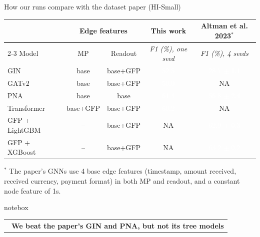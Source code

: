 \documentclass[aspectratio=169,10pt,t]{beamer}
\makeatletter
\newif\ifkeyboxfirst
\newcommand{\keyboxrow}{\ifkeyboxfirst\global\keyboxfirstfalse\else\\[2pt]\fi\usebeamertemplate{itemize item}~}
\newenvironment{keybox}[1][\bfseries]{\par\smallskip\noindent\global\keyboxfirsttrue
  \let\item\keyboxrow
  \begin{beamercolorbox}[rounded=true,sep=4pt,center,wd=\textwidth]{notebox}
  \begin{tabular}{@{}>{#1}l@{}}}{\end{tabular}\end{beamercolorbox}}
\makeatother
\begin{document}
\begin{frame}{How our runs compare with the dataset paper (HI-Small)}
  \vspace{-0.4em}
  \begin{table}
    \small
    \setlength{\tabcolsep}{5pt}
    \renewcommand{\arraystretch}{1.05}
    \begin{tabular}{@{}lcccc@{}}
      \toprule
      & \multicolumn{2}{c}{Edge features} & This work & Altman et al. 2023$^{*}$ \\
      \cmidrule(lr){2-3}
      Model & MP & Readout & \textit{F1 (\%), one seed} & \textit{F1 (\%), 4 seeds} \\
      \midrule
      GIN & base & base+GFP & \cellcolor[HTML]{246C37}\textcolor{white}{52.5} & \cellcolor[HTML]{74C476}\textcolor{white}{28.7 $\pm$ 1.1} \\
      GATv2 & base & base+GFP & \cellcolor[HTML]{2C753E}\textcolor{white}{50.0} & NA \\
      PNA & base & base & \cellcolor[HTML]{064B20}\textcolor{white}{61.4} & \cellcolor[HTML]{165C2C}\textcolor{white}{56.8 $\pm$ 2.4} \\
      Transformer & base+GFP & base+GFP & \cellcolor[HTML]{0A4F23}\textcolor{white}{60.2} & NA \\
      GFP + LightGBM & -- & base+GFP & NA & \cellcolor[HTML]{01451C}\textcolor{white}{62.9 $\pm$ 0.3} \\
      GFP + XGBoost & -- & base+GFP & NA & \cellcolor[HTML]{00441B}\textcolor{white}{63.2 $\pm$ 0.2} \\
      \bottomrule
    \end{tabular}
  \end{table}
  \vspace{-0.6em}
  {\scriptsize\color{inkgrey}$^{*}$ The paper's GNNs use 4 base edge features (timestamp, amount received,
   received currency, payment format) in both MP and readout, and a constant node feature of 1s.\par}
  \vspace{0.2em}
  \begin{keybox}
    \item We beat the paper's GIN and PNA, but not its tree models
  \end{keybox}
\end{frame}
\end{document}
